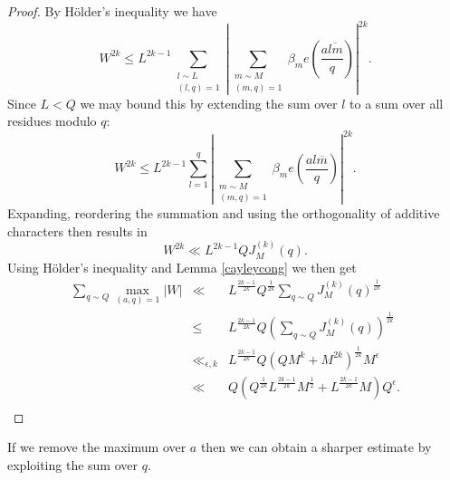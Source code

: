 \documentclass[12pt]{article}
\newcommand{\twosum}[2]{\sum_{\substack{#1\\#2}}}
\begin{document}
\begin{proof}
By H\"older's inequality we have 
$$W^{2k}\leq L^{2k-1}\twosum{l\sim L}{(l,q)=1}\left|\twosum{m\sim M}{(m,q)=1}\beta_m e(\frac{a\overline{lm}}{q})\right|^{2k}.$$
Since $L<Q$ we may bound this by extending the sum over $l$ to a sum over all residues modulo $q$:
$$W^{2k}\leq L^{2k-1}\sum_{l=1}^q\left|\twosum{m\sim M}{(m,q)=1}\beta_m e(\frac{al\overline m}{q})\right|^{2k}.$$
Expanding, reordering the summation and using the orthogonality of additive characters then results in 
$$W^{2k}\ll  L^{2k-1}Q J^{(k)}_M(q).$$
Using H\"older's inequality and Lemma \ref{cayleycong} we then get 
\begin{eqnarray*}
\sum_{q\sim Q}\max_{(a,q)=1}|W|&\ll&L^{\frac{2k-1}{2k}}Q^{\frac{1}{2k}}\sum_{q\sim Q} J^{(k)}_M(q)^{\frac{1}{2k}}\\
&\leq&L^{\frac{2k-1}{2k}}Q\left(\sum_{q\sim
  Q}J^{(k)}_M(q)\right)^{\frac{1}{2k}}\\
&\ll_{\epsilon,k}&L^{\frac{2k-1}{2k}}Q(QM^k+M^{2k})^{\frac{1}{2k}}M^\epsilon\\
&\ll&Q(Q^{\frac{1}{2k}}L^{\frac{2k-1}{2k}}M^{\frac12}+L^{\frac{2k-1}{2k}}M)Q^\epsilon.\\
\end{eqnarray*}
\end{proof}

If we remove the maximum over $a$ then we can obtain a sharper estimate by exploiting the sum over $q$.
\end{document}
